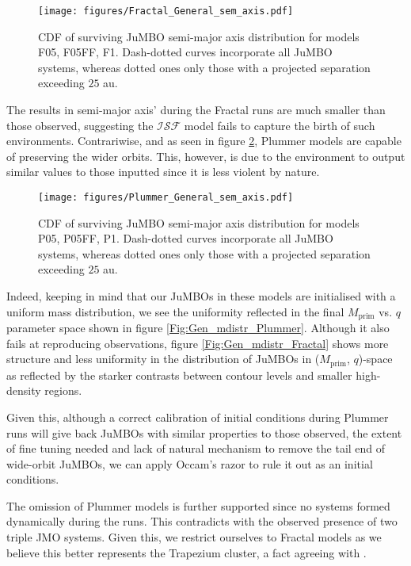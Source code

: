 \documentclass[aa]{aa}
\begin{document}
   \begin{figure}
    \centering
        \texttt{[image: figures/Fractal\_General\_sem\_axis.pdf]}
        \caption{CDF of surviving JuMBO semi-major axis distribution for models F05, F05FF, F1. Dash-dotted curves incorporate all JuMBO systems, whereas dotted ones only those with a projected separation exceeding $25$ au.}
         \label{Fig:Gen_Semi_Fractal}
   \end{figure}
    
    The results in semi-major axis' during the Fractal runs are much smaller than those observed, suggesting the $\mathcal{ISF}$ model fails to capture the birth of such environments. Contrariwise, and as seen in figure \ref{Fig:Gen_Semi_Plummer}, Plummer models are capable of preserving the wider orbits. This, however, is due to the environment to output similar values to those inputted since it is less violent by nature.
   
   \begin{figure}
    \centering
        \texttt{[image: figures/Plummer\_General\_sem\_axis.pdf]}
        \caption{CDF of surviving JuMBO semi-major axis distribution for models P05, P05FF, P1. Dash-dotted curves incorporate all JuMBO systems, whereas dotted ones only those with a projected separation exceeding $25$ au.}
         \label{Fig:Gen_Semi_Plummer}
   \end{figure}

    Indeed, keeping in mind that our JuMBOs in these models are initialised with a uniform mass distribution, we see the uniformity reflected in the final $M_{\mathrm{prim}}$ vs. $q$ parameter space shown in figure \ref{Fig:Gen_mdistr_Plummer}. Although it also fails at reproducing observations, figure \ref{Fig:Gen_mdistr_Fractal} shows more structure and less uniformity in the distribution of JuMBOs in ($M_{\mathrm{prim}}$, $q$)-space as reflected by the starker contrasts between contour levels and smaller high-density regions.
    
    Given this, although a correct calibration of initial conditions during Plummer runs will give back JuMBOs with similar properties to those observed, the extent of fine tuning needed and lack of natural mechanism to remove the tail end of wide-orbit JuMBOs, we can apply Occam's razor to rule it out as an initial conditions. 
    
    The omission of Plummer models is further supported since no systems formed dynamically during the runs. This contradicts with the observed presence of two triple JMO systems. Given this, we restrict ourselves to Fractal models as we believe this better represents the Trapezium cluster, a fact agreeing with \citet{2016MNRAS.457..313P}.
   
\end{document}
